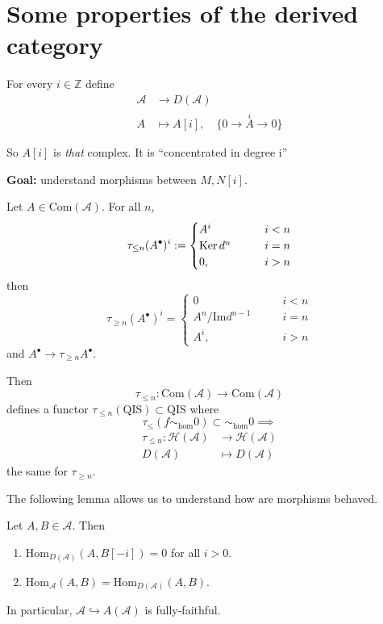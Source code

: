 \section{Some properties of the derived category}
\label{subsection-some-properties-of-the-derived-category}

For every $i \in \mathbb{Z}$ define
\begin{align*}
\mathcal{A} &\longrightarrow D(\mathcal{A}) \\
A &\longmapsto A[i], \quad \{0 \to \overset{i}{A} \to 0\}
\end{align*}

So $A[i]$ is {\it that} complex. It is ``concentrated in degree i''

{\bf Goal:} understand morphisms between $M,N[i]$.

\begin{definition}
\label{definition-embedding-in-Com}
Let $A \in \text{Com}(\mathcal{A})$. For all $n$, 
$$
\tau_{\leq n}(A^{\bullet})^i:=\begin{cases}
A^i\qquad &i<n \\
\mathop{\mathrm{Ker}} d^n\qquad &i=n\\
0,\quad &i>n
\end{cases}
$$ 
then 
$$
\tau_{\geq  n}(A^{\bullet})^i=\begin{cases}
0\qquad
 &i<n \\
A^n/\text{Im}d^{n-1}\qquad &i=n\\
A^i,\qquad &i>n
\end{cases}
$$
and $A^{\bullet}\to\tau_{\geq n}A^{\bullet}$.
\end{definition}

Then
$$
\tau_{\leq n}:\text{Com}(\mathcal{A}) \to \text{Com}(\mathcal{A})
$$
defines a functor $\tau_{\leq n}(\text{QIS})\subset \text{QIS}$ 
where 
$$
\tau_{\leq }(f \sim _{\text{hom}}0) \subset \sim_{\text{hom}}0
\implies
$$
\begin{align*}
\tau_{\leq n}: \mathcal{H}(\mathcal{A}) &\longrightarrow
\mathcal{H}(\mathcal{A}) \\
D(\mathcal{A}) &\longmapsto D(\mathcal{A})
\end{align*}
the same for $\tau_{\geq n}$.

\medskip
The following lemma allows us to understand how are morphisms behaved.

\begin{lemma}
\label{lemma-Homs}
Let $A,B \in \mathcal{A}$. Then
 \begin{enumerate}
\item $\text{Hom}_{D(\mathcal{A})}(A,B[-i])=0$ for all $i>0$.
\item $\text{Hom}_{\mathcal{A}}(A,B)=\text{Hom}_{D(\mathcal{A})}(A,B)$.
\end{enumerate}
In particular, $\mathcal{A} \hookrightarrow A(\mathcal{A})$ is fully-faithful.
\end{lemma}

